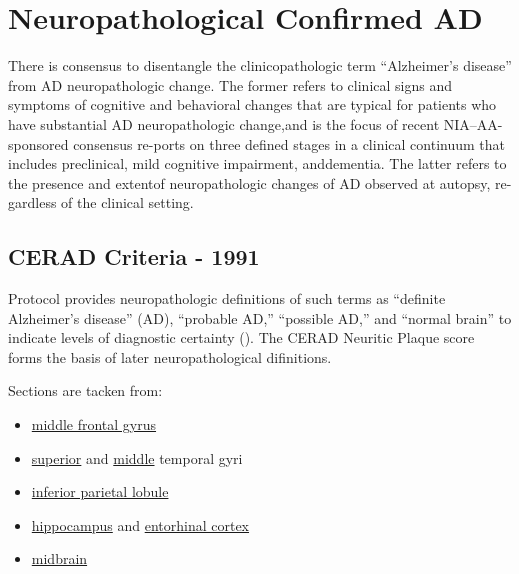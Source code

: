 \documentclass[]{book}
\providecommand{\tightlist}{%
  \setlength{\itemsep}{0pt}\setlength{\parskip}{0pt}}
\begin{document}
\hypertarget{neuropathological-confirmed-ad}{%
\section{Neuropathological Confirmed AD}\label{neuropathological-confirmed-ad}}

There is consensus to disentangle the clinicopathologic term ``Alzheimer's disease'' from AD neuropathologic change. The former refers to clinical signs and symptoms of cognitive and behavioral changes that are typical for patients who have substantial AD neuropathologic change,and is the focus of recent NIA--AA-sponsored consensus re-ports on three defined stages in a clinical continuum that includes preclinical, mild cognitive impairment, anddementia. The latter refers to the presence and extentof neuropathologic changes of AD observed at autopsy, re-gardless of the clinical setting.

\hypertarget{cerad-criteria---1991}{%
\subsection{CERAD Criteria - 1991}\label{cerad-criteria---1991}}

Protocol provides neuropathologic definitions of such terms as ``definite Alzheimer's disease'' (AD), ``probable AD,'' ``possible AD,'' and ``normal brain'' to indicate levels of diagnostic certainty (\citet{Mirra479}). The CERAD Neuritic Plaque score forms the basis of later neuropathological difinitions.

Sections are tacken from:

\begin{itemize}
\tightlist
\item
  \href{https://en.wikipedia.org/wiki/Middle_frontal_gyrus}{middle frontal gyrus}
\item
  \href{https://en.wikipedia.org/wiki/Superior_temporal_gyrus}{superior} and \href{https://en.wikipedia.org/wiki/Middle_temporal_gyrus}{middle} temporal gyri
\item
  \href{https://en.wikipedia.org/wiki/Inferior_parietal_lobule}{inferior parietal lobule}
\item
  \href{https://en.wikipedia.org/wiki/Hippocampus}{hippocampus} and \href{https://en.wikipedia.org/wiki/Entorhinal_cortex}{entorhinal cortex}
\item
  \href{https://en.wikipedia.org/wiki/Midbrain}{midbrain}
\end{itemize}
\end{document}
